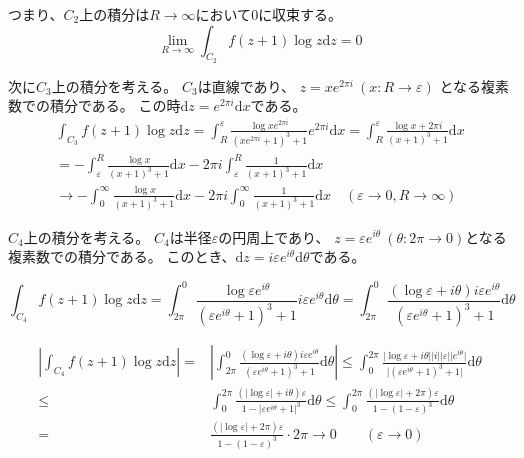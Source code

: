 \documentclass[12pt,b5paper]{ltjsarticle}
\begin{document}
つまり、$C_2$上の積分は$R\to\infty$において$0$に収束する。
\begin{equation}
 \lim_{R\to\infty}\int_{C_2} f(z+1)\log{z}\mathrm{d}z=0
\end{equation}

次に$C_3$上の積分を考える。
$C_3$は直線であり、
$z=x e^{2\pi i} \ (x:R\to\varepsilon)$
となる複素数での積分である。
この時$\mathrm{d}z=e^{2\pi i}\mathrm{d}x$である。
\begin{align}
  \int_{C_3} f(z+1)\log{z}\mathrm{d}z
   =
  \int_{R}^{\varepsilon} \frac{\log{x e^{2\pi i}}}{(x e^{2\pi i}+1)^3+1}e^{2\pi i}\mathrm{d}x
  =
  \int_{R}^{\varepsilon} \frac{ \log{x} + 2\pi i}{(x+1)^3 +1}\mathrm{d}x\\
  =
 -\int_{\varepsilon}^{R} \frac{ \log{x} }{(x+1)^3 +1}\mathrm{d}x
 - 2\pi i\int_{\varepsilon}^{R} \frac{ 1 }{(x+1)^3 +1}\mathrm{d}x\\
 \to -\int_{0}^{\infty} \frac{ \log{x} }{(x+1)^3 +1}\mathrm{d}x
 - 2\pi i\int_{0}^{\infty} \frac{ 1 }{(x+1)^3 +1}\mathrm{d}x
 \quad (\varepsilon\to 0, R\to\infty)
\end{align}


$C_4$上の積分を考える。
$C_4$は半径$\varepsilon$の円周上であり、
$z=\varepsilon e^{i\theta} \ (\theta : 2\pi \to 0)$となる複素数での積分である。
このとき、$\mathrm{d}z = i \varepsilon e^{i\theta}\mathrm{d}\theta$である。

\begin{equation}
 \int_{C_4}f(z+1)\log{z}\mathrm{d}z
  = \int_{2\pi}^{0}
  \frac{\log{\varepsilon e^{i\theta}}}
  {(\varepsilon e^{i\theta}+1)^3+1} i\varepsilon e^{i\theta}\mathrm{d}\theta
  = \int_{2\pi}^{0} \frac{ (\log{\varepsilon}+i\theta) i\varepsilon e^{i\theta}}
{(\varepsilon e^{i\theta}+1)^3+1} \mathrm{d}\theta
\end{equation}

\begin{align}
 \left\lvert
  \int_{C_4}f(z+1)\log{z}\mathrm{d}z
 \right\rvert
  =&
 \left\lvert
   \int_{2\pi}^{0} \frac{ (\log{\varepsilon}+i\theta) i\varepsilon e^{i\theta}}
{(\varepsilon e^{i\theta}+1)^3+1} \mathrm{d}\theta
 \right\rvert
  \leq 
   \int_{0}^{2\pi} \frac{ \lvert \log{\varepsilon}+i\theta \rvert \lvert i \rvert \lvert \varepsilon \rvert \lvert  e^{i\theta} \rvert}
   { \lvert(\varepsilon e^{i\theta}+1)^3+1\rvert} \mathrm{d}\theta \\
 \leq &
   \int_{0}^{2\pi} \frac{ (\lvert \log{\varepsilon} \rvert + i\theta) \varepsilon }
   { 1- \lvert \varepsilon e^{i\theta}+1 \rvert^3} \mathrm{d}\theta
 \leq
   \int_{0}^{2\pi} \frac{ (\lvert \log{\varepsilon} \rvert + 2\pi) \varepsilon }
   { 1- (1-\varepsilon  )^3} \mathrm{d}\theta\\
 = &
   \frac{ (\lvert \log{\varepsilon} \rvert + 2\pi) \varepsilon }
   { 1- (1-\varepsilon  )^3} \cdot 2\pi
 \to 0 \qquad (\varepsilon\to 0)
\end{align}
\end{document}
